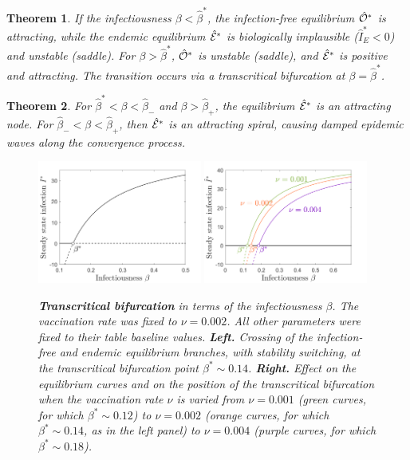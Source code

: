 \documentclass[10pt]{article}
\newtheorem{thm}{Theorem}[section]
\begin{document}
\begin{thm}
If the infectiousness $\beta< \hat{\beta}^*$, the infection-free equilibrium $\hat{\cal O}^*$ is attracting, while the endemic equilibrium $\hat{\cal E}^*$ is biologically implausible ($\hat{I}_E^*<0$) and unstable (saddle). For $\beta>\hat{\beta}^*$, $\hat{\cal O}^*$ is unstable (saddle), and $\hat{\cal E}^*$ is positive and attracting. The transition occurs via a transcritical bifurcation at $\beta=\hat{\beta}^*$.
\end{thm}

\begin{thm}
For $\hat{\beta}^*<\beta<\hat{\beta}_{-}$ and $\beta>\hat{\beta}_{+}$, the equilibrium $\hat{\cal E}^*$ is an attracting node. For $\hat{\beta}_{-}<\beta<\hat{\beta}_{+}$, then $\hat{\cal E}^*$ is an attracting spiral, causing damped epidemic waves along the convergence process.
\end{thm}


\begin{figure}[h!]
\begin{center}
\includegraphics[width=0.48\textwidth]{figures/transcritical_scheme2}
\includegraphics[width=0.48\textwidth]{figures/transcritical_scheme2_examples.png}
\end{center}
\caption{\emph{{\bf Transcritical bifurcation} in terms of the infectiousness $\beta$. The vaccination rate was fixed to $\nu=0.002$. All other parameters were fixed to their table baseline values. {\bf Left.} Crossing of the infection-free and endemic equilibrium branches, with stability switching, at the transcritical bifurcation point $\beta^* \sim 0.14$. {\bf Right.} Effect on the equilibrium curves and on the position of the transcritical bifurcation when the vaccination rate $\nu$ is varied from $\nu = 0.001$ (green curves, for which $\beta^* \sim 0.12$) to $\nu=0.002$ (orange curves, for which $\beta^* \sim 0.14$, as in the left panel) to $\nu=0.004$ (purple curves, for which $\beta^* \sim 0.18$).}}
\label{transcritical_scheme2}
\end{figure}
\end{document}
